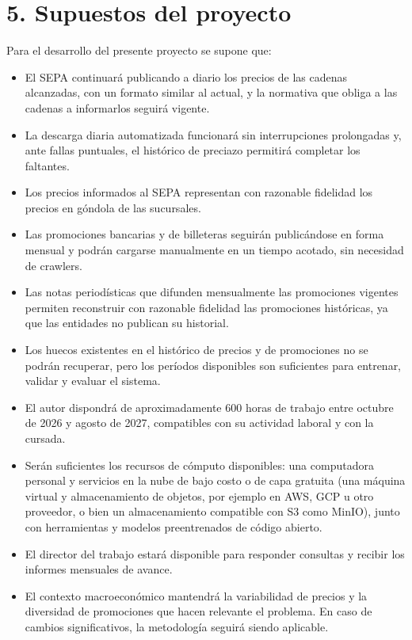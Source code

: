 \documentclass[
11pt, %
]{charter}
\begin{document}
\section{5. Supuestos del proyecto}
\label{sec:supuestos}

Para el desarrollo del presente proyecto se supone que:

\begin{itemize}
	\item El SEPA continuará publicando a diario los precios de las cadenas alcanzadas, con un formato similar al actual, y la normativa que obliga a las cadenas a informarlos seguirá vigente.
	\item La descarga diaria automatizada funcionará sin interrupciones prolongadas y, ante fallas puntuales, el histórico de preciazo permitirá completar los faltantes.
	\item Los precios informados al SEPA representan con razonable fidelidad los precios en góndola de las sucursales.
	\item Las promociones bancarias y de billeteras seguirán publicándose en forma mensual y podrán cargarse manualmente en un tiempo acotado, sin necesidad de crawlers.
	\item Las notas periodísticas que difunden mensualmente las promociones vigentes permiten reconstruir con razonable fidelidad las promociones históricas, ya que las entidades no publican su historial.
	\item Los huecos existentes en el histórico de precios y de promociones no se podrán recuperar, pero los períodos disponibles son suficientes para entrenar, validar y evaluar el sistema.
	\item El autor dispondrá de aproximadamente 600 horas de trabajo entre octubre de 2026 y agosto de 2027, compatibles con su actividad laboral y con la cursada.
	\item Serán suficientes los recursos de cómputo disponibles: una computadora personal y servicios en la nube de bajo costo o de capa gratuita (una máquina virtual y almacenamiento de objetos, por ejemplo en AWS, GCP u otro proveedor, o bien un almacenamiento compatible con S3 como MinIO), junto con herramientas y modelos preentrenados de código abierto.
	\item El director del trabajo estará disponible para responder consultas y recibir los informes mensuales de avance.
	\item El contexto macroeconómico mantendrá la variabilidad de precios y la diversidad de promociones que hacen relevante el problema. En caso de cambios significativos, la metodología seguirá siendo aplicable.
\end{itemize}
\end{document}
